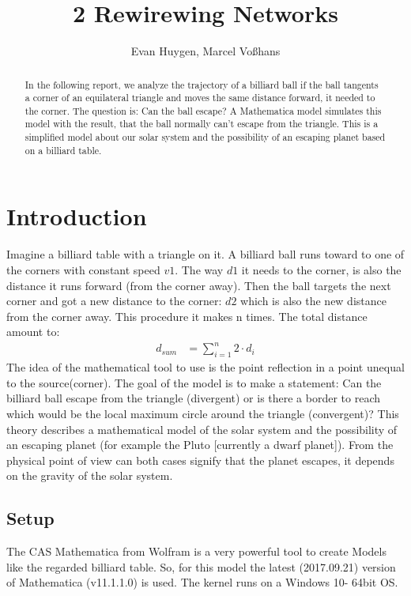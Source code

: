 \documentclass[11pt,a4paper]{article}
\begin{document}
\title{2 Rewirewing Networks}
\author{Evan Huygen, Marcel Vo{\ss}hans}
\maketitle

\begin{abstract}
In the following report, we analyze the trajectory of a billiard ball if the ball tangents a corner of an equilateral triangle and moves the same distance forward, it needed to the corner. The question is: Can the ball escape? A Mathematica model simulates this model with the result, that the ball normally can’t escape from the triangle. This is a simplified model about our solar system and the possibility of an escaping planet based on a billiard table.
\end{abstract}

\tableofcontents

\section{Introduction}
Imagine a billiard table with a triangle on it. A billiard ball runs toward to one of the corners with constant speed \(v1\). The way \(d1\) it needs to the corner, is also the distance it runs forward (from the corner away). Then the ball targets the next corner and got a new distance to the corner: \(d2\) which is also the new distance from the corner away. This procedure it makes n times. The total distance amount to:
\begin{align}
d_{sum}&= \sum \limits_{i=1}^n 2 \cdot d_i
\end{align}
The idea of the mathematical tool to use is the point reflection in a point unequal to the source(corner). The goal of the model is to make a statement: Can the billiard ball escape from the triangle (divergent) or is there a border to reach which would be the local maximum circle around the triangle (convergent)? This theory describes a mathematical model of the solar system and the possibility of an escaping planet (for example the Pluto [currently a dwarf planet]). From the physical point of view can both cases signify that the planet escapes, it depends on the gravity of the solar system.
 \subsection{Setup}
The CAS Mathematica from Wolfram is a very powerful tool to create Models like the regarded billiard table. So, for this model the latest (2017.09.21) version of Mathematica (v11.1.1.0) is used. The kernel runs on a Windows 10- 64bit OS.
\end{document}
